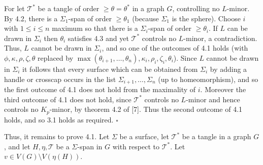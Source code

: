 For let $\mathscr{T}^*$ be a tangle of order $\ge \theta = \theta^*$ in a graph $G$, controlling no $L$-minor. By 4.2, there is a $\Sigma_1$-span of order $\ge \theta_1$ (because $\Sigma_1$ is the sphere). Choose $i$ with $1 \le i \le n$ maximum so that there is a $\Sigma_i$-span of order $\ge \theta_i$. If $L$ can be drawn in $\Sigma_i$ then $\theta_i$ satisfies 4.3 and yet $\mathscr{T}^*$ controls no $L$-minor, a contradiction. Thus, $L$ cannot be drawn in $\Sigma_i$, and so one of the outcomes of 4.1 holds (with $\phi, \kappa, \rho, \zeta, \theta$ replaced by $\max(\theta_{i+1}, \dots, \theta_n), \kappa_i, \rho_i, \zeta_i, \theta_i$). Since $L$ cannot be drawn in $\Sigma_i$ it follows that every surface which can be obtained from $\Sigma_i$ by adding a handle or crosscap occurs in the list $\Sigma_{i+1}, \dots, \Sigma_n$ (up to homeomorphism), and so the first outcome of 4.1 does not hold from the maximality of $i$. Moreover the third outcome of 4.1 does not hold, since $\mathscr{T}^*$ controls no $L$-minor and hence controls no $K_p$-minor, by theorem 4.2 of [7]. Thus the second outcome of 4.1 holds, and so 3.1 holds as required. $\square$


Thus, it remains to prove 4.1. Let $\Sigma$ be a surface, let $\mathscr{T}^*$ be a tangle in a graph $G$, and let $H, \eta, \mathscr{T}$ be a $\Sigma$-span in $G$ with respect to $\mathscr{T}^*$. Let $v \in V(G) \setminus V(\eta(H))$.
